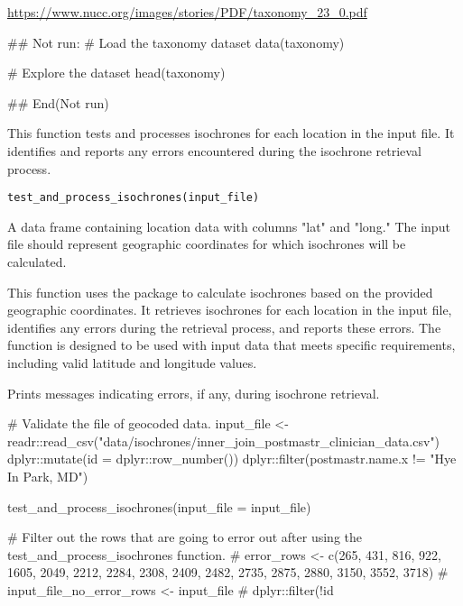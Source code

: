 \documentclass[a4paper]{book}
\begin{document}
%
\begin{Source}
\url{https://www.nucc.org/images/stories/PDF/taxonomy_23_0.pdf}
\end{Source}
%
\begin{Examples}
\begin{ExampleCode}
## Not run: 
# Load the taxonomy dataset
data(taxonomy)

# Explore the dataset
head(taxonomy)

## End(Not run)
\end{ExampleCode}
\end{Examples}
%
\begin{Description}
This function tests and processes isochrones for each location in the input file. It
identifies and reports any errors encountered during the isochrone retrieval process.
\end{Description}
%
\begin{Usage}
\begin{verbatim}
test_and_process_isochrones(input_file)
\end{verbatim}
\end{Usage}
%
\begin{Arguments}
\begin{ldescription}
\item[\code{input\_file}] A data frame containing location data with columns "lat" and "long."
The input file should represent geographic coordinates for which
isochrones will be calculated.
\end{ldescription}
\end{Arguments}
%
\begin{Details}
This function uses the  package to calculate isochrones based on the
provided geographic coordinates. It retrieves isochrones for each location in
the input file, identifies any errors during the retrieval process, and reports
these errors. The function is designed to be used with input data that meets
specific requirements, including valid latitude and longitude values.
\end{Details}
%
\begin{Value}
Prints messages indicating errors, if any, during isochrone retrieval.
\end{Value}
%
\begin{Examples}
\begin{ExampleCode}
# Validate the file of geocoded data.
input_file <- readr::read_csv("data/isochrones/inner_join_postmastr_clinician_data.csv") %
  dplyr::mutate(id = dplyr::row_number()) %
  dplyr::filter(postmastr.name.x != "Hye In Park, MD")

test_and_process_isochrones(input_file = input_file)

# Filter out the rows that are going to error out after using the test_and_process_isochrones function.
# error_rows <- c(265, 431, 816, 922, 1605, 2049, 2212, 2284, 2308, 2409, 2482, 2735, 2875, 2880, 3150, 3552, 3718)
# input_file_no_error_rows <- input_file %
#   dplyr::filter(!id %

\end{ExampleCode}
\end{Examples}
\end{document}

